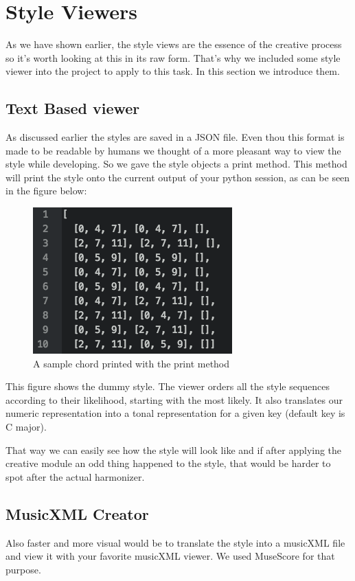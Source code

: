 \section{Style Viewers} 
\label{sec:viewers}
As we have shown earlier, the style views are the essence of the creative process so it's worth looking at this in its raw form. That's why we included some style viewer into the project to apply to this task. In this section we introduce them.

\subsection{Text Based viewer}
\label{sec:viewers.text}
As discussed earlier the styles are saved in a JSON file. Even thou this format is made to be readable by humans we thought of a more pleasant way to view the style while developing. So we gave the style objects a print method. This method will print the style onto the current output of your python session, as can be seen in the figure below:
\begin{figure}[ht]
\centring
\includegraphics[scale=1]{Chapters/pic/text_print.png}
\caption{A sample chord printed with the print method}
\end{figure}

This figure shows the dummy style. The viewer orders all the style sequences according to their likelihood, starting with the most likely.  It also translates our numeric representation into a tonal representation for a given key (default key is C major).

That way we can easily see how the style will look like and if after applying the creative module an odd thing happened to the style, that would be harder to spot after the actual harmonizer. 

\subsection{MusicXML Creator}
\label{sec:viewers.musicxml}
Also faster and more visual would be to translate the style into a musicXML file and view it with your favorite musicXML viewer. We used MuseScore for that purpose. 

